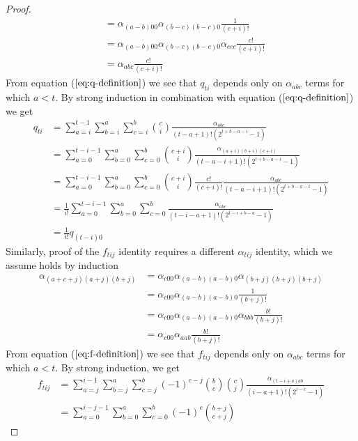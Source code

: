 \documentclass{article}
\begin{document}
\begin{proof}
\begin{align*}
&= \alpha_{(a-b)00}\alpha_{(b-c)(b-c)0}\frac{1}{(c+i)!} \\
&= \alpha_{(a-b)00}\alpha_{(b-c)(b-c)0}\alpha_{ccc}\frac{c!}{(c+i)!} \\
&= \alpha_{abc}\frac{c!}{(c+i)!}
\end{align*}
From equation ($\ref{eq:q-definition}$) we see that $q_{ti}$ depends only on $\alpha_{abc}$ terms for which $a < t$. By strong induction in combination with equation ($\ref{eq:q-definition}$) we get
\begin{align*}
q_{ti}
&=
 \sum_{a=i}^{t-1}
   \sum_{b=i}^{a}
     \sum_{c=i}^{b}
       \binom{c}{i}
       \frac{\alpha_{abc}}
            {(t-a+1)!(2^{t+b-a-i}-1)} \\
&=
 \sum_{a=0}^{t-i-1}
   \sum_{b=0}^{a}
     \sum_{c=0}^{b}
       \binom{c+i}{i}
       \frac{\alpha_{(a+i)(b+i)(c+i)}}
            {(t-a-i+1)!(2^{t+b-a-i}-1)} \\
&=
 \sum_{a=0}^{t-i-1}
   \sum_{b=0}^{a}
     \sum_{c=0}^{b}
       \binom{c+i}{i}
       \frac{c!}{(c+i)!}
       \frac{\alpha_{abc}}
            {(t-a-i+1)!(2^{t+b-a-i}-1)} \\
&=
 \frac{1}{i!}
 \sum_{a=0}^{t-i-1}
   \sum_{b=0}^{a}
     \sum_{c=0}^{b}
       \frac{\alpha_{abc}}
            {(t-i-a+1)!(2^{t-i+b-a}-1)} \\
&= 
  \frac{1}{i!}
  q_{(t-i)0}
\end{align*}
Similarly, proof of the $f_{tij}$ identity requires a different $\alpha_{tij}$ identity, which we assume holds by induction
\begin{align*}
\alpha_{(a+c+j)(a+j)(b+j)}
&= \alpha_{c00}\alpha_{(a-b)(a-b)0} \alpha_{(b+j)(b+j)(b+j)} \\
&= \alpha_{c00}\alpha_{(a-b)(a-b)0} \frac{1}{(b+j)!} \\
&= \alpha_{c00}\alpha_{(a-b)(a-b)0} \alpha_{bbb}\frac{b!}{(b+j)!} \\
&= \alpha_{c00}\alpha_{aab} \frac{b!}{(b+j)!}
\end{align*}
From equation ($\ref{eq:f-definition}$) we see that $f_{tij}$ depends only on $\alpha_{abc}$ terms for which $a < t$. By strong induction, we get
\begin{align*}
f_{tij} 
&= 
  \sum_{a=j}^{i-1}
    \sum_{b=j}^{a}
      \sum_{c=j}^{b}
        (-1)^{c-j}
        \binom{b}{c}
        \binom{c}{j}
        \frac{\alpha_{(t-i+a)ab}}
             {(i-a+1)!(2^{i-c}-1)} \\
&= 
  \sum_{a=0}^{i-j-1}
    \sum_{b=0}^{a}
      \sum_{c=0}^{b}
        (-1)^{c}
        \binom{b+j}{c+j}

\end{align*}
\end{proof}
\end{document}
